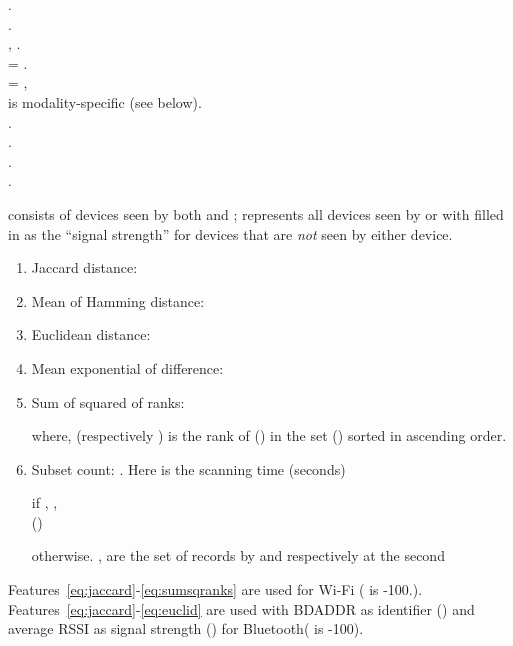 {\noindent . \\
\noindent . \\
\noindent , . \\
\noindent  =  . \\
\noindent  =    
, \\\hspace*{1.3cm}  is modality-specific (see below). \\
\noindent . \\
\noindent . \\
\noindent . \\
\noindent
.

 consists of devices seen by both  and ;
 represents all devices seen by  or  with
 filled in as the ``signal strength'' for devices that are
\textit{not} seen by either device.  
\begin{enumerate}

\item \label{eq:jaccard}Jaccard distance: 


\item \label{eq:hamming}Mean of Hamming distance: 


\item \label{eq:euclid}Euclidean distance: 


\item \label{eq:expdif}Mean exponential of difference: 


\item \label{eq:sumsqranks}Sum of squared of ranks: 



where,
 (respectively ) is the rank of 
() in the set  () sorted in
ascending order.



\item \label{eq:subsetcnt} Subset count: .
Here  is the scanning time (seconds)

  if , , \\\hspace*{1.4cm}()

  otherwise. ,  are the set of records by 
 and  respectively at the  second

\end{enumerate}





Features~\ref{eq:jaccard}-\ref{eq:sumsqranks} are used for Wi-Fi ( is -100.). Features~\ref{eq:jaccard}-\ref{eq:euclid} are used with BDADDR as 
identifier () and average RSSI as signal strength () for Bluetooth( is -100). 


}
